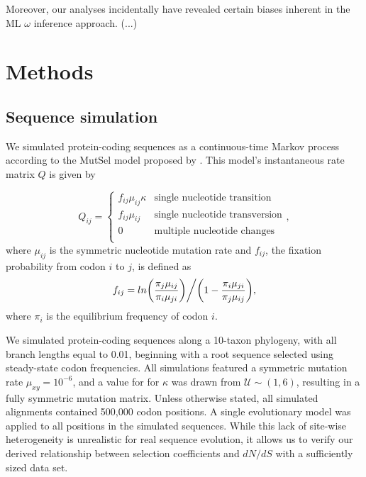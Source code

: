 \documentclass[11pt]{article}
\begin{document}
Moreover, our analyses incidentally have revealed certain biases inherent in the ML $\omega$ inference approach. (...)
 


\section*{Methods}

\subsection*{Sequence simulation}
We simulated protein-coding sequences as a continuous-time Markov
process \cite{Yang2006} according to the MutSel model proposed by \cite{HalpernBruno1998}. This model's instantaneous rate matrix $Q$ is given by 

\begin{equation}
Q_{ij} = \left\{ \begin{array}{rl}
              f_{ij}\mu_{ij}\kappa               &\mbox{single nucleotide transition} \\
              f_{ij}\mu_{ij}                          &\mbox{single nucleotide transversion} \\
              0                                           &\mbox{multiple nucleotide changes} \\             
         \end{array} \right.,
\end{equation} where $\mu_{ij}$ is the symmetric nucleotide mutation rate and $f_{ij}$, the fixation probability from codon $i$ to $j$, is defined as \begin{equation}f_{ij} = ln\bigg{(}\frac{\pi_j\mu_{ij}}{\pi_i\mu_{ji}}\bigg{)}\bigg{/}\bigg{(}1 - \frac{\pi_i\mu_{ji}}{\pi_j\mu_{ij}}\bigg{)},\end{equation} where $\pi_i$ is the equilibrium frequency of codon $i$.

We simulated protein-coding sequences along a 10-taxon phylogeny, with all branch lengths equal to 0.01, beginning with a root sequence selected using steady-state codon frequencies. All simulations featured a symmetric mutation rate $\mu_{xy} = 10^{-6}$, and a value for for $\kappa$ was drawn from $\mathcal{U} \sim (1,6)$, resulting in a fully symmetric mutation matrix. Unless otherwise stated, all simulated alignments contained 500,000 codon positions. A single evolutionary model was applied to all positions in the simulated sequences. While this lack of site-wise heterogeneity is unrealistic for real sequence evolution, it allows us to verify our derived relationship between selection coefficients and $dN/dS$ with a sufficiently sized data set.
\end{document}
